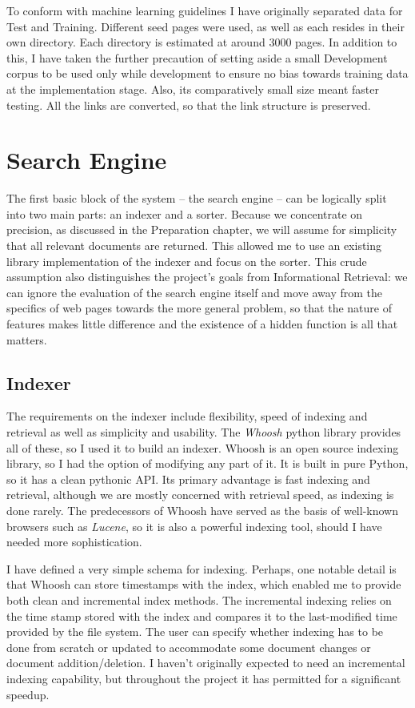 \documentclass[11pt,twoside,notitlepage]{report}
\begin{document}
To conform with machine learning guidelines I have originally separated data
for Test and Training. Different seed pages were used, as well as each resides
in their own directory. Each directory is estimated at around 3000 pages. In
addition to this, I have taken the further precaution of setting aside a small
Development corpus to be used only while development to ensure no bias towards
training data at the implementation stage. Also, its comparatively small size
meant faster testing. All the links are converted, so that the link structure
is preserved.

\section{Search Engine}

The first basic block of the system -- the search engine -- can be logically
split into two main parts: an indexer and a sorter. Because we concentrate on
precision, as discussed in the Preparation chapter, we will assume for
simplicity that all relevant documents are returned. This allowed me to use an 
existing library implementation of the indexer and focus on the sorter.
This crude assumption also distinguishes the project's goals from Informational
Retrieval: we can ignore the evaluation of the search engine itself and move
away from the specifics of web pages towards the more general problem, so that
the nature of features makes little difference and the existence of a hidden
function is all that matters.

\subsection*{Indexer}

The requirements on the indexer include flexibility, speed of indexing and
retrieval as well as simplicity and usability.  The \textit{Whoosh} python
library provides all of these, so I used it to build an indexer. Whoosh is an
open source indexing library, so I had the option of modifying any part of it.
It is  built in pure Python, so it has a clean pythonic API. Its primary
advantage is fast indexing and retrieval, although we are mostly concerned with
retrieval speed, as indexing is done rarely. The predecessors of Whoosh have
served as the basis of well-known browsers such as \textit{Lucene}, so it is
also a powerful indexing tool, should I have needed more sophistication.

I have defined a very simple schema for indexing. Perhaps, one notable detail
is that Whoosh can store timestamps with the index, which enabled me to provide
both clean and incremental index methods. The incremental indexing relies on
the time stamp stored with the index and compares it to the last-modified time
provided by the file system. The user can specify whether indexing has to be
done from scratch or updated to accommodate some document changes or document
addition/deletion. I haven't originally expected to need an incremental
indexing capability, but throughout the project it has permitted for a
significant speedup.
\end{document}
